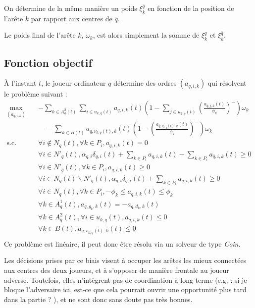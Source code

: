 \documentclass[a4paper,11pt,headings=normal]{scrartcl}
\theoremstyle{mythm}
\begin{document}
On détermine de la même manière un poids $\xi^{\bar q}_k$ en
fonction de la position de l'arête $k$ par rapport aux centres de
$\bar q$.

Le poids final de l'arête $k$, $\omega_k$, est alors simplement la
somme de $\xi^q_k$ et $\xi^{\bar q}_k$.

\subsection{Fonction objectif}
\label{decisions:fonction-objectif}

{\`A} l'instant $t$, le joueur ordinateur $q$ détermine des ordres
$(a_{q,i,k})$ qui résolvent le problème suivant :
\begin{equation}
  \begin{aligned}
    \max_{(a_{q,i,k})} \quad & -\sum_{k \in A^2_q(t)} \sum_{i \in u_{k,q}(t)} a_{q,i,k}(t) \left( 1 - \sum_{j \in u_{k,{\bar q}}(t)} \left( \frac{a_{{\bar q},j,k}(t)}{\phi_k} \right)^- \right) \omega_k \\
    & \quad - \sum_{k \in B(t)} a_{q,\nu_{k,q}(t),k}(t)  \left( 1 - \left( \frac{a_{{\bar q},\nu_{k,{\bar q}}(t),k}(t)}{\phi_k} \right)^- \right) \omega_k \\
    \text{s.c.} \quad & \forall i \notin N_q(t), \forall k \in P_i, a_{q,i,k}(t) = 0 \\
    & \forall i \in N'_q(t), \alpha_{q,i} \delta_{q,i}(t) + \sum_{k \in P_i} a_{q,i,k}(t) - \sum_{k \in P_i} a_{{\bar q},i,k}(t) \geq 0 \\
    & \forall i \in N'_{\bar q}(t), \forall k \in P_i, a_{q,i,k}(t) \geq 0 \\
    & \forall i \in N_q(t) \backslash N'_q(t), \alpha_{q,i} \delta_{q,i}(t) + \sum_{k \in P_i} a_{q,i,k}(t) \geq 0 \\
    & \forall i \in N_q(t), \forall k \in P_i, -\phi_k \leq a_{q,i,k}(t) \leq \phi_k \\
    & \forall k \in A^1_q(t), a_{q,g_k,k}(t) = -a_{q,d_k,k}(t) \\
    & \forall k \in A^2_q(t), \forall i \in u_{k,q}(t), a_{q,i,k}(t) \leq 0 \\
    & \forall k \in B(t), a_{q,v_{k,q}(t),k}(t) \leq 0 \\
  \end{aligned}
\end{equation}
Ce problème est linéaire, il peut donc être résolu via un solveur de
type \emph{Coin}.

Les décisions prises par ce biais visent à occuper les arêtes les
mieux connectées aux centres des deux joueurs, et à s'opposer de
manière frontale au joueur adverse. Toutefois, elles n'intègrent pas
de coordination à long terme (e.g. : \og si je bloque l'adversaire
ici, est-ce que cela pourrait ouvrir une opportunité plus tard dans la
partie ? \fg{}), et ne sont donc sans doute pas très bonnes.

\printbibliography
\end{document}
